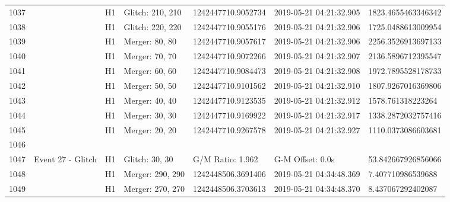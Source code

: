 \begin{longtable}{lllllll}
1037 &                                                    &       H1 &  Glitch: 210, 210 &  1242447710.9052734 &  2019-05-21 04:21:32.905 &  1823.4655463346342 \\
1038 &                                                    &       H1 &  Glitch: 220, 220 &  1242447710.9055176 &  2019-05-21 04:21:32.906 &  1725.0488613009954 \\
1039 &                                                    &       H1 &    Merger: 80, 80 &  1242447710.9057617 &  2019-05-21 04:21:32.906 &  2256.3526913697133 \\
1040 &                                                    &       H1 &    Merger: 70, 70 &  1242447710.9072266 &  2019-05-21 04:21:32.907 &  2136.5896712395547 \\
1041 &                                                    &       H1 &    Merger: 60, 60 &  1242447710.9084473 &  2019-05-21 04:21:32.908 &  1972.7895528178733 \\
1042 &                                                    &       H1 &    Merger: 50, 50 &  1242447710.9101562 &  2019-05-21 04:21:32.910 &  1807.9267016369806 \\
1043 &                                                    &       H1 &    Merger: 40, 40 &  1242447710.9123535 &  2019-05-21 04:21:32.912 &   1578.761318223264 \\
1044 &                                                    &       H1 &    Merger: 30, 30 &  1242447710.9169922 &  2019-05-21 04:21:32.917 &  1338.2872032757416 \\
1045 &                                                    &       H1 &    Merger: 20, 20 &  1242447710.9267578 &  2019-05-21 04:21:32.927 &  1110.0373086603681 \\
1046 &                                                    &          &                   &                     &                          &                     \\
1047 &                                  Event 27 - Glitch &       H1 &    Glitch: 30, 30 &    G/M Ratio: 1.962 &         G-M Offset: 0.0s &  53.842667926856066 \\
1048 &                                                    &       H1 &  Merger: 290, 290 &  1242448506.3691406 &  2019-05-21 04:34:48.369 &   7.407710986539688 \\
1049 &                                                    &       H1 &  Merger: 270, 270 &  1242448506.3703613 &  2019-05-21 04:34:48.370 &   8.437067292402087 \\

\end{longtable}
